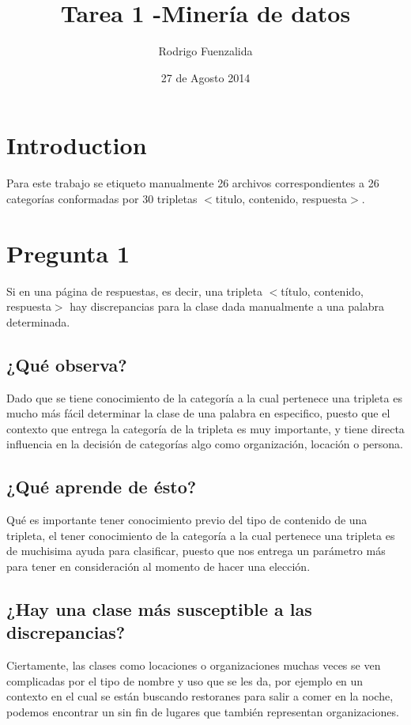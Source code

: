 \documentclass{article}
\title{Tarea 1 -Minería de datos}
\author{Rodrigo Fuenzalida}
\date{27 de Agosto 2014}
\begin{document}
\maketitle

\section{Introduction}
Para este trabajo se etiqueto manualmente 26 archivos correspondientes a 26 categorías conformadas por 30 tripletas $<$titulo, contenido, respuesta$>$.

\section{Pregunta 1}
Si en una página de respuestas, es decir, una tripleta $<$título, contenido, respuesta$>$ hay discrepancias para la clase dada manualmente a una palabra determinada.
\subsection{¿Qué observa?}
Dado que se tiene conocimiento de la categoría a la cual pertenece una tripleta es mucho más fácil determinar la clase de una palabra en especifico, puesto que el contexto que entrega la categoría de la tripleta es muy importante, y tiene directa influencia en la decisión de categorías algo como organización, locación o persona.

\subsection{¿Qué aprende de ésto?}
Qué es importante tener conocimiento previo del tipo de contenido de una tripleta, el tener conocimiento de la categoría a la cual pertenece una tripleta es de muchisima ayuda para clasificar, puesto que nos entrega un parámetro más para tener en consideración al momento de hacer una elección.

\subsection{¿Hay una clase más susceptible a las discrepancias?}
Ciertamente, las clases como locaciones o organizaciones muchas veces se ven complicadas por el tipo de nombre y uso que se les da, por ejemplo en un contexto en el cual se están buscando restoranes para salir a comer en la noche, podemos encontrar un sin fin de lugares que también representan organizaciones.
\end{document}

